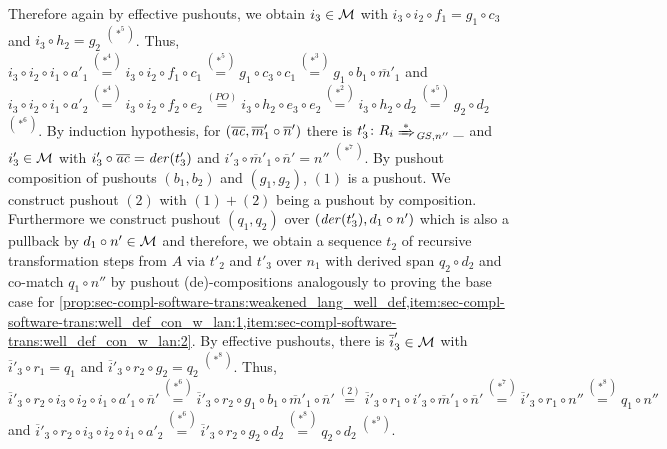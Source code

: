 \begin{enumerate}
  Therefore again by effective pushouts, we obtain $i_3 \in {\cal M}$ with $i_3 \circ i_2 \circ f_1=g_1 \circ c_3$ and $i_3 \circ h_2=g_2$ $^{(*^5)}$.
  Thus, $i_3 \circ i_2 \circ i_1 \circ a'_1 \stackrel{(*^4)}{=} i_3 \circ i_2 \circ f_1 \circ c_1 \stackrel{(*^5)}{=} g_1 \circ c_3 \circ c_1 \stackrel{(*^3)}{=} g_1 \circ b_1 \circ \overline{m}'_1$ and $i_3 \circ i_2 \circ i_1 \circ a'_2 \stackrel{(*^4)}{=} i_3 \circ i_2 \circ f_2 \circ e_2 \stackrel{(PO)}{=} i_3 \circ h_2 \circ e_3 \circ e_2 \stackrel{(*^2)}{=} i_3 \circ h_2 \circ d_2 \stackrel{(*^5)}{=} g_2 \circ d_2$ $^{(*^6)}$.
  By induction hypothesis, for $(\overline{\mathit{ac}},\overline{m}'_1 \circ \overline{n}')$ there is $t'_3\colon R_i \Trans{*}_{\GS,n''} \_$ and $i'_3 \in {\cal M}$ with $i'_3 \circ \overline{\mathit{ac}}=\mathit{der}(t'_3)$ and $i'_3 \circ \overline{m}'_1 \circ \overline{n}'=n''$ $^{(*^7)}$.
  By pushout composition of pushouts $(b_1,b_2)$ and $(g_1,g_2)$, $(1)$ is a pushout.
  We construct pushout $(2)$ with $(1)+(2)$ being a pushout by composition.
  Furthermore we construct pushout $(q_1,q_2)$ over $(\mathit{der}(t'_3),d_1 \circ n')$ which is also a pullback by $d_1 \circ n' \in {\cal M}$ and therefore, we obtain a sequence $t_2$ of recursive transformation steps from $A$ via $t'_2$ and $t'_3$ over $n_1$ with derived span $q_2 \circ d_2$ and co-match $q_1 \circ n''$ by pushout (de)-compositions analogously to proving the base case for \cref{prop:sec-compl-software-trans:weakened_lang_well_def,item:sec-compl-software-trans:well_def_con_w_lan:1,item:sec-compl-software-trans:well_def_con_w_lan:2}.
  By effective pushouts, there is $\overline{i}'_3 \in {\cal M}$ with $\overline{i}'_3 \circ r_1=q_1$ and $\overline{i}'_3 \circ r_2 \circ g_2=q_2$ $^{(*^8)}$.
  Thus, $\overline{i}'_3 \circ r_2 \circ i_3 \circ i_2 \circ i_1 \circ a'_1 \circ \overline{n}' \stackrel{(*^6)}{=} \overline{i}'_3 \circ r_2 \circ g_1 \circ b_1 \circ \overline{m}'_1 \circ \overline{n}' \stackrel{(2)}{=} \overline{i}'_3 \circ r_1 \circ i'_3 \circ \overline{m}'_1 \circ \overline{n}' \stackrel{(*^7)}{=} \overline{i}'_3 \circ r_1 \circ n'' \stackrel{(*^8)}{=} q_1 \circ n''$ and $\overline{i}'_3 \circ r_2 \circ i_3 \circ i_2 \circ i_1 \circ a'_2 \stackrel{(*^6)}{=} \overline{i}'_3 \circ r_2 \circ g_2 \circ d_2 \stackrel{(*^8)}{=} q_2 \circ d_2$ $^{(*^9)}$.
  \begin{center}
\end{center}
\end{enumerate}
